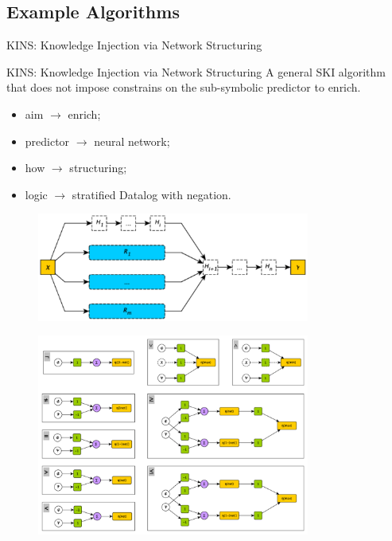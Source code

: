 \documentclass[presentation]{beamer}\mode<presentation>{\usetheme{AMSBolognaFC}}
\begin{document}
\subsection{Example Algorithms}

\begin{frame}[allowframebreaks]{KINS: Knowledge Injection via Network Structuring}
    
    \begin{block}{KINS: Knowledge Injection via Network Structuring}
        A general SKI algorithm that does not impose constrains on the sub-symbolic predictor to enrich.
        \begin{itemize}
            \item aim $\rightarrow$ enrich;
            \item predictor $\rightarrow$ neural network;
            \item how $\rightarrow$ structuring;
            \item logic $\rightarrow$ stratified Datalog with negation.
        \end{itemize}        
    \end{block}

    \framebreak
    
    \begin{figure}
        \centering
        \includegraphics[width=0.8\textwidth]{figures/kins-architecture}
    \end{figure}

    \framebreak
    
    
    
    \framebreak
    
    \begin{figure}
        \centering
        \includegraphics[width=0.8\textwidth]{figures/kins-fuzzifier-modules}
    \end{figure}


\end{frame}
\end{document}
